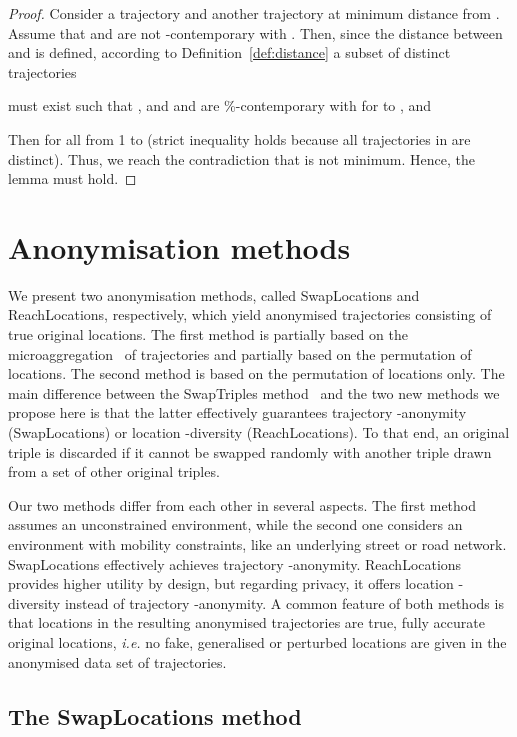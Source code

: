 \begin{proof} 
Consider a trajectory  and another trajectory
 at minimum distance from .
Assume that  and  are not -contemporary with .
Then, since the distance
between  and  is defined, according to
Definition~\ref{def:distance} a subset of distinct trajectories

must exist such that , 
and  and  are \%-contemporary
with  for  to , and

Then  for all
 from 1 to  (strict inequality holds because
all trajectories in  are distinct). Thus,
we reach the contradiction that  is not minimum.
Hence, the lemma must hold.
\end{proof}




\section{Anonymisation methods} \label{sec:anonymisation}

We present two anonymisation methods,
called SwapLocations and ReachLocations, respectively, which yield anonymised trajectories consisting of true original locations.
The first method is
partially based on the microaggregation~\cite{domingo02}
of trajectories and partially based
on the permutation of locations.
The second method is based on the permutation of locations only.
The main difference between
the SwapTriples method~\cite{domingo10springl}
and the two new methods we propose here is that the latter
effectively guarantees trajectory -anonymity (SwapLocations)
or location -diversity (ReachLocations).
To that end, an original
triple is discarded if it cannot be swapped randomly with
another triple drawn from a set of  other original triples.

Our two methods differ from each other in several aspects.
The first method assumes an unconstrained environment, while
the second one considers an environment with mobility constraints,
like an underlying street or road network.
SwapLocations effectively achieves trajectory -anonymity.
ReachLocations provides higher utility by design, but regarding
privacy, it offers location -diversity instead of
trajectory -anonymity. A common feature of both methods
is that locations in the resulting anonymised trajectories
are true, fully accurate original locations,
{\em i.e.} no fake, generalised or perturbed locations are
given in the anonymised data set of trajectories.

\subsection{The SwapLocations method}
\label{swaploc}

